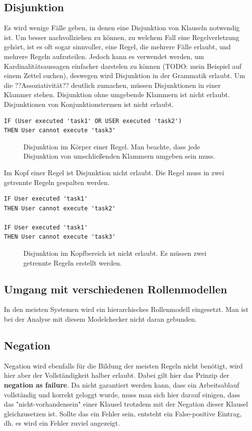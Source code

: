 \subsection{Disjunktion}
\label{sec:disjunction}
Es wird wenige Fälle geben, in denen eine Disjunktion von Klauseln notwendig ist. Um besser nachvollziehen zu können, zu welchem Fall eine Regelverletzung gehört, ist es oft sogar sinnvoller, eine Regel, die mehrere Fälle erlaubt, und mehrere Regeln aufzuteilen. Jedoch kann es verwendet werden, um Kardinalitätsaussagen einfacher darstelen zu können (TODO: mein Beispiel auf einem Zettel suchen), deswegen wird Disjunktion in der Grammatik erlaubt. Um die ??Assoziativität?? deutlich zumachen, müssen Disjunktionen in einer Klammer stehen. Disjunktion ohne umgebende Klammern ist nicht erlaubt. Disjunktionen von Konjunktionstermen ist nicht erlaubt.

\begin{verbatim}
IF (User executed 'task1' OR USER executed 'task2')
THEN User cannot execute 'task3'
\end{verbatim}
\begin{figure}[!h]
\caption{Disjunktion im Körper einer Regel. Man beachte, dass jede Disjunktion von umschließenden Klammern umgeben sein muss.}
\label{fig:disjunction1}
\end{figure}

Im Kopf einer Regel ist Disjunktion nicht erlaubt. Die Regel muss in zwei getrennte Regeln gespalten werden.

\begin{verbatim}
IF User executed 'task1'
THEN User cannot execute 'task2'

IF User executed 'task1'
THEN User cannot execute 'task3'
\end{verbatim}
\begin{figure}[!h]
\caption{Disjunktion im Kopfbereich ist nicht erlaubt. Es müssen zwei getrennte Regeln erstellt werden.}
\label{fig:disjunction2}
\end{figure}

\subsection{Umgang mit verschiedenen Rollenmodellen}
In den meisten Systemen wird ein hierarchisches Rollenmodell eingesetzt. Man ist bei der Analyse mit diesem Modelchecker nicht daran gebunden.

\subsection{Negation}
Negation wird ebenfalls für die Bildung der meisten Regeln nicht benötigt, wird hier aber der Vollständigkeit halber erlaubt. Dabei gilt hier das Prinzip der \textbf{negation as failure}. Da nicht garantiert werden kann, dass ein Arbeitsablauf vollständig und korrekt geloggt wurde, muss man sich hier darauf einigen, dass das "nicht-vorhandensein" einer Klausel trotzdem mit der Negation dieser Klausel gleichzusetzen ist. Sollte das ein Fehler sein, entsteht ein False-positive Eintrag, dh. es wird ein Fehler zuviel angezeigt.



